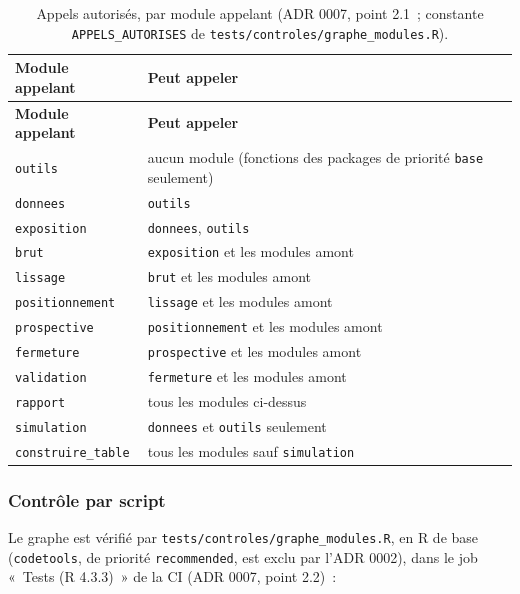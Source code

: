 \documentclass[a4paper,11pt]{article}
\newcommand{\code}[1]{\texttt{\small #1}}
\begin{document}
\begin{center}
\small
{}
\begin{longtable}{@{}p{3.6cm}p{11.2cm}@{}}
\caption{Appels autorisés, par module appelant (ADR 0007, point 2.1~;
constante \code{APPELS\_AUTORISES} de \code{tests/controles/graphe\_modules.R}).}
\label{tab:appels-autorises}\\
\rowcolor{tableheader}
\textcolor{financeblue}{\textbf{Module appelant}} &
\textcolor{financeblue}{\textbf{Peut appeler}} \\
\endfirsthead
\rowcolor{tableheader}
\textcolor{financeblue}{\textbf{Module appelant}} &
\textcolor{financeblue}{\textbf{Peut appeler}} \\
\endhead
\code{outils} & aucun module (fonctions des packages de priorité \code{base} seulement) \\
\code{donnees} & \code{outils} \\
\code{exposition} & \code{donnees}, \code{outils} \\
\code{brut} & \code{exposition} et les modules amont \\
\code{lissage} & \code{brut} et les modules amont \\
\code{positionnement} & \code{lissage} et les modules amont \\
\code{prospective} & \code{positionnement} et les modules amont \\
\code{fermeture} & \code{prospective} et les modules amont \\
\code{validation} & \code{fermeture} et les modules amont \\
\code{rapport} & tous les modules ci-dessus \\
\code{simulation} & \code{donnees} et \code{outils} seulement \\
\code{construire\_table} & tous les modules sauf \code{simulation} \\
\end{longtable}
\end{center}

\subsubsection*{Contrôle par script}

Le graphe est vérifié par \code{tests/controles/graphe\_modules.R}, en R de
base (\code{codetools}, de priorité \code{recommended}, est exclu par
l'ADR 0002), dans le job «~Tests (R 4.3.3)~» de la CI (ADR 0007, point 2.2)~:
\end{document}
